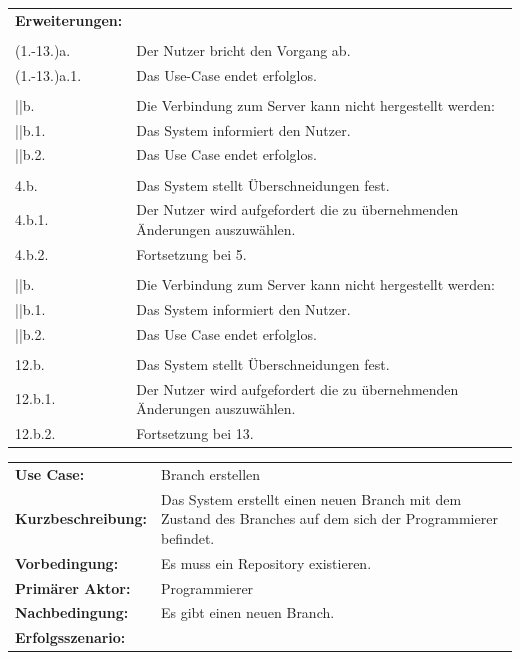\documentclass[a4paper]{article}
\begin{document}
\begin{tabularx}{\textwidth}{lX}
\textbf{Erweiterungen:}\\\\
\qquad \qquad (1.-13.)a. & Der Nutzer bricht den Vorgang ab.\\
\qquad \qquad (1.-13.)a.1. & Das Use-Case endet erfolglos.\\
\\
\qquad \qquad 2||b. & Die Verbindung zum Server kann nicht hergestellt werden: \\
\qquad \qquad 2||b.1. & Das System informiert den Nutzer. \\
\qquad \qquad 2||b.2. & Das Use Case endet erfolglos. \\

\\
\qquad \qquad 4.b. & Das System stellt Überschneidungen fest.\\
\qquad \qquad 4.b.1. & Der Nutzer wird aufgefordert die zu übernehmenden Änderungen auszuwählen.\\
\qquad \qquad 4.b.2. & Fortsetzung bei 5.\\
\\
\qquad \qquad 11||b. & Die Verbindung zum Server kann nicht hergestellt werden: \\
\qquad \qquad 11||b.1. & Das System informiert den Nutzer. \\
\qquad \qquad 11||b.2. & Das Use Case endet erfolglos. \\
\\
\qquad \qquad 12.b. & Das System stellt Überschneidungen fest.\\
\qquad \qquad 12.b.1. & Der Nutzer wird aufgefordert die zu übernehmenden Änderungen auszuwählen.\\
\qquad \qquad 12.b.2. & Fortsetzung bei 13.\\
\end{tabularx}

\newpage

\begin{tabularx}{\textwidth}{lX}
\\
\textbf{Use Case:} & Branch erstellen\\
\textbf{Kurzbeschreibung:} & Das System erstellt einen neuen Branch mit dem Zustand des Branches auf dem sich der Programmierer befindet.\\
\textbf{Vorbedingung:} & Es muss ein Repository existieren.\\
\textbf{Primärer Aktor:} & Programmierer\\
\textbf{Nachbedingung:}	& Es gibt einen neuen Branch.\\
\textbf{Erfolgsszenario:} & 
\end{tabularx}
\end{document}
